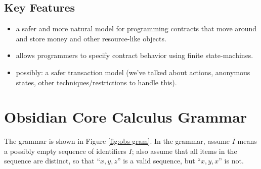 \documentclass[runningheads,a4paper]{llncs}
\begin{document}
\subsection{Key Features}

\begin{itemize}
\item a safer and more natural model for programming contracts that move around and store money and other resource-like objects.
\item allows programmers to specify contract behavior using finite state-machines.
\item possibly: a safer transaction model (we've talked about actions, anonymous states, other techniques/restrictions to handle this).
\end{itemize}

\fi

\section{Obsidian Core Calculus Grammar}

The grammar is shown in Figure \ref{fig:obs-gram}. In the grammar, assume $\overline{I}$ means a possibly empty sequence of identifiers $I$; also assume that all items in the sequence are distinct, so that ``$x, y, z$'' is a valid sequence, but ``$x, y, x$'' is not.\\

\newcommand{\stateS}{\texttt{state}}
\newcommand{\ownedS}{\texttt{owned}}
\newcommand{\readonlyS}{\texttt{readonly}}
\newcommand{\sharedS}{\texttt{shared}}
\newcommand{\contractS}{\texttt{contract}}
\newcommand{\extcontractS}{\texttt{external\ contract}}
\newcommand{\letS}{\texttt{let}}
\newcommand{\throwS}{\texttt{throw}}
\newcommand{\tryS}{\texttt{try}}
\newcommand{\catchS}{\texttt{catch}}
\newcommand{\thisS}{\texttt{this}}
\newcommand{\inS}{\texttt{in}}
\newcommand{\caseS}{\texttt{case}}
\newcommand{\defaultS}{\texttt{default}}
\newcommand{\newS}{\texttt{new}}
\newcommand{\permS}{\triangleright}
\newcommand{\functionS}{\texttt{function}}
\newcommand{\transactionS}{\texttt{transaction}}
\newcommand{\voidS}{\textsf{void}}
\newcommand{\unpackS}{\texttt{unpack}}
\newcommand{\packS}{\texttt{pack_to}}
\newcommand{\withS}{\texttt{returns}}
\newcommand{\asS}{\texttt{as}}
\newcommand{\ofS}{\texttt{managed_by}}
\newcommand{\trueS}{\textsf{t}}
\newcommand{\falseS}{\textsf{f}}
\newcommand{\constS}{\texttt{const}}
\newcommand{\ifS}{\texttt{if}}
\newcommand{\thenS}{\texttt{then}}
\newcommand{\elseS}{\texttt{else}}
\newcommand{\resS}{\texttt{res}}
\end{document}
